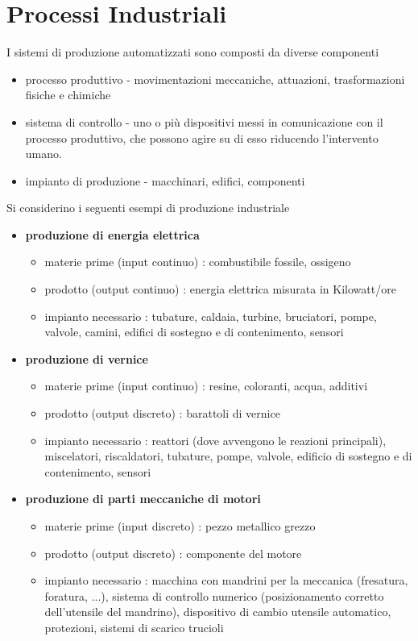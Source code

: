 \documentclass[10pt, letterpaper]{report}
\begin{document}
\section{Processi Industriali}
I sistemi di produzione automatizzati sono composti da 
diverse componenti\begin{itemize}
    \item processo produttivo - movimentazioni meccaniche, attuazioni, 
    trasformazioni fisiche e chimiche 
    \item sistema di controllo - uno o più dispositivi messi in comunicazione 
    con il processo produttivo, che possono agire su di esso riducendo 
    l'intervento umano. 
    \item impianto di produzione - macchinari, edifici, componenti
\end{itemize}
Si considerino i seguenti esempi di produzione industriale\begin{itemize}
    \item \textbf{produzione di energia elettrica} \begin{itemize}
        \item materie prime (input continuo) : combustibile fossile, ossigeno 
        \item prodotto (output continuo) : energia elettrica misurata in Kilowatt/ore
        \item impianto necessario : tubature, caldaia, turbine, bruciatori, pompe, valvole, camini, edifici di
        sostegno e di contenimento, sensori
        
    \end{itemize}
    \item \textbf{produzione di vernice} \begin{itemize}
        \item materie prime (input continuo) : resine, coloranti, acqua, additivi
        \item prodotto (output discreto) : barattoli di vernice
        \item impianto necessario : reattori (dove avvengono le reazioni principali), miscelatori, riscaldatori,
        tubature, pompe, valvole, edificio di sostegno e di contenimento, sensori
    \end{itemize}
    \item \textbf{produzione di parti meccaniche di motori} \begin{itemize}
        \item materie prime (input discreto) : pezzo metallico grezzo
        \item prodotto (output discreto) : componente del motore
        \item impianto necessario : macchina con mandrini per la meccanica (fresatura, foratura, ...), sistema di
        controllo numerico (posizionamento corretto dell'utensile del mandrino),
        dispositivo di cambio utensile automatico, protezioni, sistemi di scarico
        trucioli
    \end{itemize}
\end{itemize}
\end{document}
